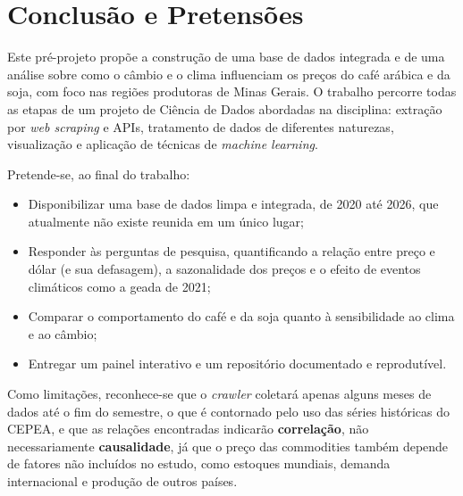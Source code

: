 \documentclass{article}
\begin{document}
\section{Conclusão e Pretensões}

Este pré-projeto propõe a construção de uma base de dados integrada e de uma análise sobre como o câmbio e
o clima influenciam os preços do café arábica e da soja, com foco nas regiões produtoras de Minas Gerais.
O trabalho percorre todas as etapas de um projeto de Ciência de Dados abordadas na disciplina: extração
por \textit{web scraping} e APIs, tratamento de dados de diferentes naturezas, visualização e aplicação de
técnicas de \textit{machine learning}.

Pretende-se, ao final do trabalho:

\begin{itemize}
      \item Disponibilizar uma base de dados limpa e integrada, de 2020 até 2026, que atualmente não existe
            reunida em um único lugar;
      \item Responder às perguntas de pesquisa, quantificando a relação entre preço e dólar (e sua
            defasagem), a sazonalidade dos preços e o efeito de eventos climáticos como a geada de 2021;
      \item Comparar o comportamento do café e da soja quanto à sensibilidade ao clima e ao câmbio;
      \item Entregar um painel interativo e um repositório documentado e reprodutível.
\end{itemize}

Como limitações, reconhece-se que o \textit{crawler} coletará apenas alguns meses de dados até o fim do
semestre, o que é contornado pelo uso das séries históricas do CEPEA, e que as relações encontradas
indicarão \textbf{correlação}, não necessariamente \textbf{causalidade}, já que o preço das commodities
também depende de fatores não incluídos no estudo, como estoques mundiais, demanda internacional e
produção de outros países.
\end{document}
